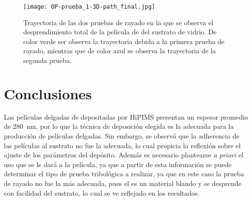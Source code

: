 \documentclass[12pt]{IEEEtran}
\begin{document}
\begin{figure}[htb]
	\centering
	\texttt{[image: OP-prueba\_1-3D-path\_final.jpg]}
	\caption{Trayectoria de las dos pruebas de rayado en la que se observa el desprendimiento total de la película de  del sustrato de vidrio. De color verde ser observa la trayectoria debida a la primera prueba de rayado, mientras que de color azul se observa la trayectoria de la segunda prueba.}
\end{figure}

\section{Conclusiones}

Las películas delgadas de  depositadas por HiPIMS presentan un espesor promedio de \qty{280}{\nm}, por lo que la técnica de deposición elegida es la adecuada para la producción de películas delgadas. Sin embargo, se observó que la adherencia de las películas al sustrato no fue la adecuada, lo cual propicia la reflexión sobre el ajuste de los parámetros del depósito. Además es necesario plantearse \emph{a priori} el uso que se le dará a la película, ya que a partir de esta información se puede determinar el tipo de prueba tribológica a realizar, ya que en este caso la prueba de rayado no fue la más adecuada, pues el  es un material blando y se desprende con facilidad del sustrato, lo cual se ve reflejado en los resultados.

\pagebreak
\nocite{*}
\printbibliography
\end{document}
